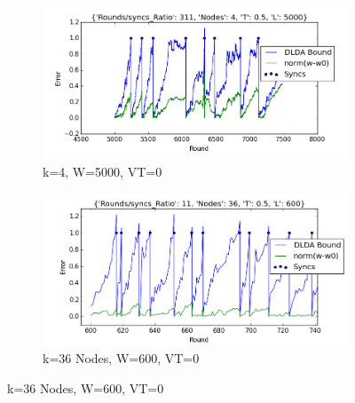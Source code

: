 \documentclass{sig-alternate-05-2015}
\begin{document}
\begin{figure}
    \centering
    \begin{subfigure}[b]{0.5\textwidth}
        \includegraphics[width=\textwidth]{PowerSupply/4nodes.png}
        \caption{k=4, W=5000, VT=0}
        \label{fig:gull}
    \end{subfigure}

    \begin{subfigure}[b]{0.5\textwidth}
        \includegraphics[width=\textwidth]{PowerSupply/36nodes.png}
        \caption{k=36 Nodes, W=600, VT=0}
        \label{fig:tiger}
    \end{subfigure}


\end{figure}
\end{document}
